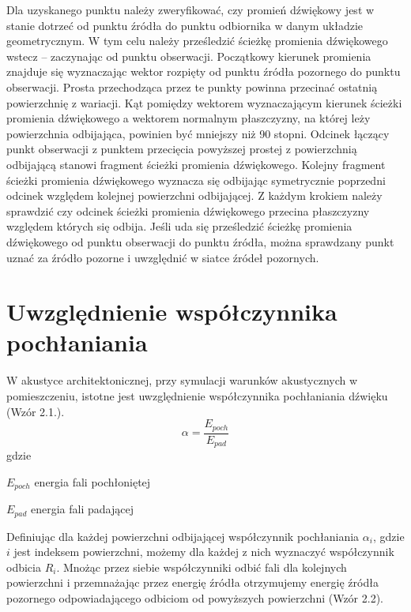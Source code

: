 Dla uzyskanego punktu należy zweryfikować, czy promień dźwiękowy jest w stanie dotrzeć od punktu źródła do punktu odbiornika w danym układzie geometrycznym. W tym celu należy prześledzić ścieżkę promienia dźwiękowego wstecz – zaczynając od punktu obserwacji. Początkowy kierunek promienia znajduje się wyznaczając wektor rozpięty od punktu źródła pozornego do punktu obserwacji. Prosta przechodząca przez te punkty powinna przecinać ostatnią powierzchnię z wariacji. Kąt pomiędzy wektorem wyznaczającym kierunek ścieżki promienia dźwiękowego a wektorem normalnym płaszczyzny, na której leży powierzchnia odbijająca, powinien być mniejszy niż 90 stopni. Odcinek łączący punkt obserwacji z punktem przecięcia powyższej prostej z powierzchnią odbijającą stanowi fragment ścieżki promienia dźwiękowego. Kolejny fragment ścieżki promienia dźwiękowego wyznacza się odbijając symetrycznie poprzedni odcinek względem kolejnej powierzchni odbijającej. Z każdym krokiem należy sprawdzić czy odcinek ścieżki promienia dźwiękowego przecina płaszczyzny względem których się odbija. Jeśli uda się prześledzić ścieżkę promienia dźwiękowego od punktu obserwacji do punktu źródła, można sprawdzany punkt uznać za źródło pozorne i uwzględnić w siatce źródeł pozornych.


\section{Uwzględnienie współczynnika pochłaniania}\label{sec:zm}

W akustyce architektonicznej, przy symulacji warunków akustycznych w pomieszczeniu, istotne jest uwzględnienie współczynnika pochłaniania dźwięku (Wzór 2.1.). \\

\begin{equation}
\alpha=\frac{E_{poch}}{E_{pad}}
\end{equation}
gdzie
\begin{eqwhere}[2cm]
        \item[$E_{poch}$] energia fali pochłoniętej
        \item[$E_{pad}$] energia fali padającej
\end{eqwhere}

Definiując dla każdej powierzchni odbijającej współczynnik pochłaniania $\alpha_i$, gdzie $i$  jest indeksem powierzchni, możemy dla każdej z nich wyznaczyć współczynnik odbicia $R_i$. Mnożąc przez siebie współczynniki odbić fali dla kolejnych powierzchni i przemnażając przez energię źródła otrzymujemy energię źródła pozornego odpowiadającego odbiciom od powyższych powierzchni (Wzór 2.2). \\

